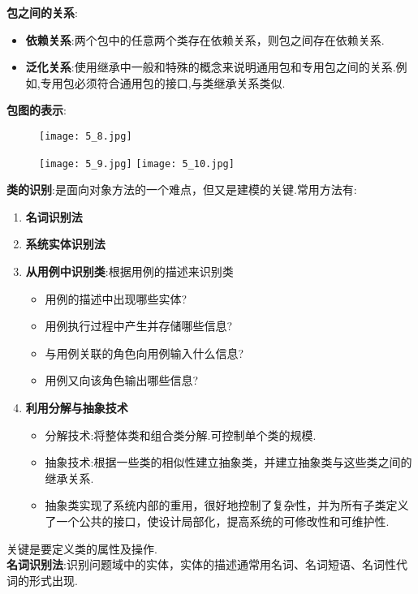 \documentclass[../main.tex]{subfiles}
\begin{document}
\noindent \textbf{包之间的关系}:
\begin{itemize}
  \item \textbf{依赖关系}:两个包中的任意两个类存在依赖关系，则包之间存在依赖关系.
  \item \textbf{泛化关系}:使用继承中一般和特殊的概念来说明通用包和专用包之间的关系.例如,专用包必须符合通用包的接口,与类继承关系类似.
\end{itemize}
\textbf{包图的表示}:
\begin{figure}[H]
  \begin{center}
    \texttt{[image: 5\_8.jpg]}
  \end{center}
\end{figure}
\begin{figure}[H]
  \texttt{[image: 5\_9.jpg]}
    \texttt{[image: 5\_10.jpg]}
\end{figure}
\noindent \textbf{类的识别}:是面向对象方法的一个难点，但又是建模的关键.常用方法有:
\begin{enumerate}
  \item \textbf{名词识别法}
  \item \textbf{系统实体识别法}
  \item \textbf{从用例中识别类}:根据用例的描述来识别类
    \begin{itemize}
      \item 用例的描述中出现哪些实体?
      \item 用例执行过程中产生并存储哪些信息?
      \item 与用例关联的角色向用例输入什么信息?
      \item 用例又向该角色输出哪些信息?
    \end{itemize}
  \item \textbf{利用分解与抽象技术}
    \begin{itemize}
      \item 分解技术:将整体类和组合类分解.可控制单个类的规模.
      \item 抽象技术:根据一些类的相似性建立抽象类，并建立抽象类与这些类之间的继承关系.
      \item 抽象类实现了系统内部的重用，很好地控制了复杂性，并为所有子类定义了一个公共的接口，使设计局部化，提高系统的可修改性和可维护性.
    \end{itemize}
\end{enumerate}
关键是要定义类的属性及操作. \\
\textbf{名词识别法}:识别问题域中的实体，实体的描述通常用名词、名词短语、名词性代词的形式出现.
\end{document}
